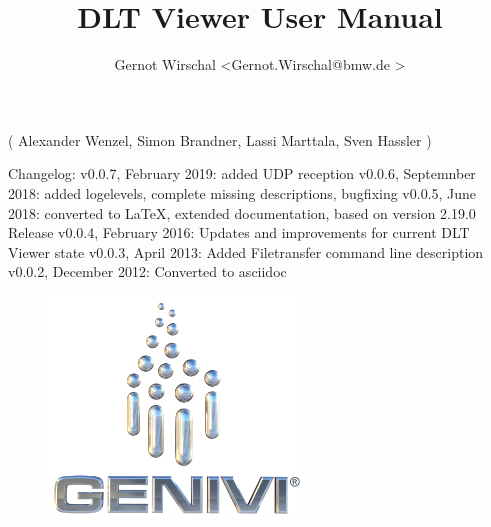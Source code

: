 \documentclass[a4paper,11pt]{article}
\begin{document}
\title{DLT Viewer User Manual}
\author{Gernot Wirschal \textless Gernot.Wirschal@bmw.de \textgreater }


\maketitle

\begin{center}
( Alexander Wenzel, Simon Brandner, Lassi Marttala, Sven Hassler ) \linebreak
\end{center}

Changelog:\linebreak
v0.0.7, February 2019: added UDP reception\linebreak
v0.0.6, Septemnber 2018: added logelevels, complete missing descriptions, bugfixing \linebreak
v0.0.5, June 2018: converted to \LaTeX, extended documentation, based on version 2.19.0 Release \linebreak
v0.0.4, February 2016: Updates and improvements for current DLT Viewer state \linebreak
v0.0.3, April 2013: Added Filetransfer command line description \linebreak
v0.0.2, December 2012: Converted to asciidoc \linebreak

\vspace{3cm}

\begin{figure}[h]
    \centering
    \includegraphics[width=0.6\textwidth]{images/genivi_transparent.png}
\end{figure}

\pagebreak

\tableofcontents

\pagebreak
\end{document}
